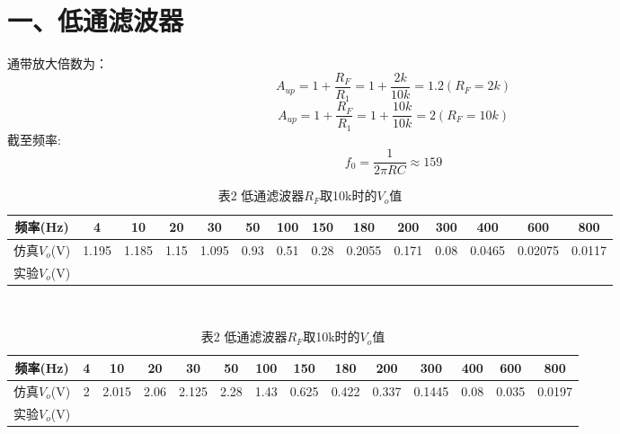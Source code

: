 \documentclass[a4paper,10pt,notitlepage]{article}
\begin{document}
	\section*{一、低通滤波器}
	通带放大倍数为：
	$$A_{up}=1+\frac{R_F}{R_1}=1+\frac{2k}{10k}=1.2(R_F=2k)$$
	$$A_{up}=1+\frac{R_F}{R_1}=1+\frac{10k}{10k}=2(R_F=10k)$$
	截至频率:
	$$f_0=\frac{1}{2\pi RC}\approx 159$$
	\begin{table}[h]
		\begin{minipage}{0.3\textwidth}
			\centering
			\begin{tabular}{|c|c|c|c|c|c|c|c|c|c|c|c|c|c|}
				\hline
				频率(Hz) & 4 & 10 & 20 & 30 & 50 & 100 & 150 & 180 & 200 & 300 & 400 & 600 & 800 \\
				\hline
				仿真$V_o$(V) & 1.195 & 1.185 & 1.15 & 1.095 & 0.93 & 0.51 & 0.28 & 0.2055 & 0.171 & 0.08 & 0.0465 & 0.02075 & 0.0117 \\
				\hline 
				实验$V_o$(V) & \qquad & \qquad & \qquad & \qquad & \qquad & \qquad & \qquad & \qquad & \qquad & \qquad & \qquad & \qquad &\qquad \\
				\hline
			\end{tabular}
			\caption*{表1 低通滤波器$R_F$取2k时的$V_o$值}
		\end{minipage}
		\\
		\begin{minipage}{0.3\textwidth}
			\centering
			\begin{tabular}{|c|c|c|c|c|c|c|c|c|c|c|c|c|c|}
				\hline
				频率(Hz) & 4 & 10 & 20 & 30 & 50 & 100 & 150 & 180 & 200 & 300 & 400 & 600 & 800 \\
				\hline
				仿真$V_o$(V) & 2 & 2.015 & 2.06 & 2.125 & 2.28 & 1.43 & 0.625 & 0.422 & 0.337 & 0.1445 & 0.08 & 0.035 & 0.0197 \\
				\hline 
				实验$V_o$(V) & \qquad & \qquad & \qquad & \qquad & \qquad & \qquad & \qquad & \qquad & \qquad & \qquad & \qquad & \qquad & \qquad \\
				\hline
			\end{tabular}
			\caption*{表2 低通滤波器$R_F$取10k时的$V_o$值}
		\end{minipage}
	\end{table}
\end{document}
